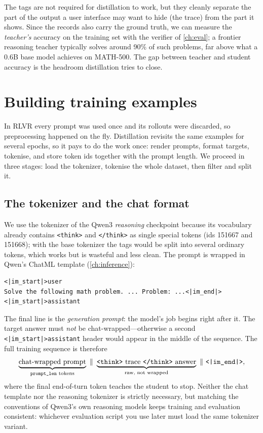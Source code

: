 The tags are not required for distillation to work, but they cleanly separate the part of the
output a user interface may want to hide (the trace) from the part it shows. Since the records
also carry the ground truth, we can measure the \emph{teacher's} accuracy on the training set
with the verifier of \cref{ch:eval}; a frontier reasoning teacher typically solves around 90\% of
such problems, far above what a 0.6B base model achieves on MATH-500. The gap between teacher and student accuracy is the headroom distillation tries
to close.
\section{Building training examples}\label{sec:distill:examples}

In RLVR every prompt was used once and its rollouts were discarded, so preprocessing happened
on the fly. Distillation revisits the same examples for several epochs, so it pays to do the
work once: render prompts, format targets, tokenise, and store token ids together with the
prompt length. We proceed in three stages: load the tokenizer, tokenise the whole dataset,
then filter and split it.

\subsection{The tokenizer and the chat format}\label{sec:distill:tok}

We use the tokenizer of the Qwen3 \emph{reasoning} checkpoint because its vocabulary already
contains \texttt{<think>} and \texttt{</think>} as single special tokens (ids 151667 and
151668); with the base tokenizer the tags would be split into several ordinary tokens, which
works but is wasteful and less clean. The prompt is wrapped in Qwen's ChatML template
(\cref{ch:inference}):
\begin{lstlisting}[style=plain]
<|im_start|>user
Solve the following math problem. ... Problem: ...<|im_end|>
<|im_start|>assistant
\end{lstlisting}
The final line is the \emph{generation prompt}: the model's job begins right after it.
The target answer must \emph{not} be chat-wrapped---otherwise a second
\texttt{<|im\_start|>assistant} header would appear in the middle of the sequence. The full
training sequence is therefore
\[
\underbrace{\text{chat-wrapped prompt}}_{\text{\texttt{prompt\_len} tokens}}\ \Vert\
\underbrace{\texttt{<think>}\ \text{trace}\ \texttt{</think>}\ \text{answer}}_{\text{raw, not wrapped}}\ \Vert\
\texttt{<|im\_end|>},
\]
where the final end-of-turn token teaches the student to stop. Neither the chat template nor
the reasoning tokenizer is strictly necessary, but matching the conventions of Qwen3's own
reasoning models keeps training and evaluation consistent: whichever evaluation script you use
later must load the same tokenizer variant.

